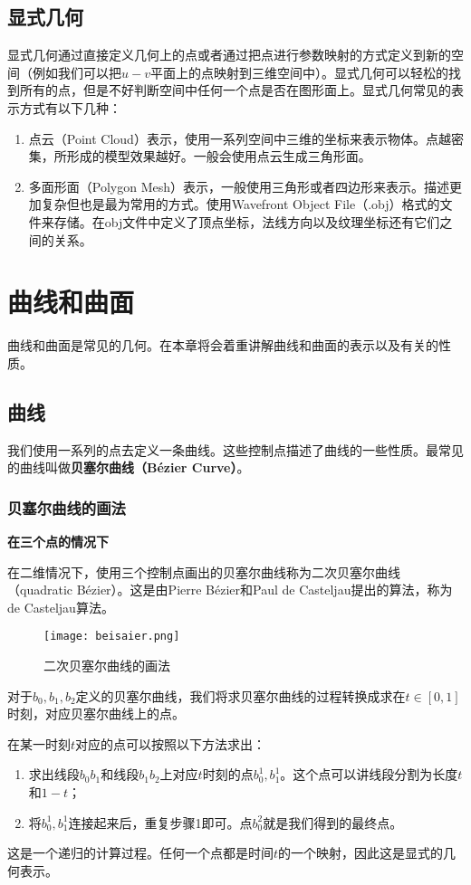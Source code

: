 \documentclass[openany]{progbookcn}
\begin{document}
\section{显式几何}
显式几何通过直接定义几何上的点或者通过把点进行参数映射的方式定义到新的空间（例如我们可以把$u-v$平面上的点映射到三维空间中）。显式几何可以轻松的找到所有的点，但是不好判断空间中任何一个点是否在图形面上。显式几何常见的表示方式有以下几种：
\begin{enumerate}
	\item 点云（Point Cloud）表示，使用一系列空间中三维的坐标来表示物体。点越密集，所形成的模型效果越好。一般会使用点云生成三角形面。
	\item 多面形面（Polygon Mesh）表示，一般使用三角形或者四边形来表示。描述更加复杂但也是最为常用的方式。使用Wavefront Object File（.obj）格式的文件来存储。在obj文件中定义了顶点坐标，法线方向以及纹理坐标还有它们之间的关系。
\end{enumerate}

\chapter{曲线和曲面}
曲线和曲面是常见的几何。在本章将会着重讲解曲线和曲面的表示以及有关的性质。

\section{曲线}
我们使用一系列的点去定义一条曲线。这些控制点描述了曲线的一些性质。最常见的曲线叫做\textbf{贝塞尔曲线（B\'ezier Curve）}。
\subsection{贝塞尔曲线的画法}
\textbf{在三个点的情况下}

在二维情况下，使用三个控制点画出的贝塞尔曲线称为二次贝塞尔曲线（quadratic B\'ezier）。这是由Pierre B\'ezier和Paul de Casteljau提出的算法，称为de Casteljau算法。

\begin{figure}[H]
	\centering
	\texttt{[image: beisaier.png]}
	\caption{二次贝塞尔曲线的画法}
	\label{fig:beisaier}
\end{figure}
对于$b_0,b_1,b_2$定义的贝塞尔曲线，我们将求贝塞尔曲线的过程转换成求在$t\in [0,1]$时刻，对应贝塞尔曲线上的点。

在某一时刻$t$对应的点可以按照以下方法求出：
\begin{enumerate}
	\item 求出线段$b_0b_1$和线段$b_1b_2$上对应$t$时刻的点$b_0^1,b_1^1$。这个点可以讲线段分割为长度$t$和$1-t$；
	\item 将$b_0^1,b_1^1$连接起来后，重复步骤1即可。点$b_0^2$就是我们得到的最终点。
\end{enumerate}
这是一个递归的计算过程。任何一个点都是时间$t$的一个映射，因此这是显式的几何表示。
\end{document}
